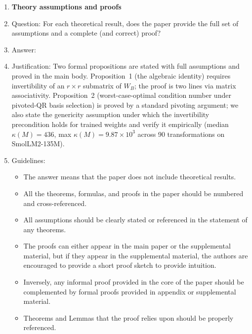 \begin{enumerate}
\begin{itemize}
        \item The authors should discuss the computational efficiency of the proposed algorithms and how they scale with dataset size.
        \item If applicable, the authors should discuss possible limitations of their approach to address problems of privacy and fairness.
        \item While the authors might fear that complete honesty about limitations might be used by reviewers as grounds for rejection, a worse outcome might be that reviewers discover limitations that aren't acknowledged in the paper. The authors should use their best judgment and recognize that individual actions in favor of transparency play an important role in developing norms that preserve the integrity of the community. Reviewers will be specifically instructed to not penalize honesty concerning limitations.
    \end{itemize}

\item {\bf Theory assumptions and proofs}
    \item[] Question: For each theoretical result, does the paper provide the full set of assumptions and a complete (and correct) proof?
    \item[] Answer: \answerYes{} %
    \item[] Justification: Two formal propositions are stated with full assumptions and proved in the main body. Proposition~1 (the algebraic identity) requires invertibility of an $r \times r$ submatrix of $W_B$; the proof is two lines via matrix associativity. Proposition~2 (worst-case-optimal condition number under pivoted-QR basis selection) is proved by a standard pivoting argument; we also state the genericity assumption under which the invertibility precondition holds for trained weights and verify it empirically (median $\kappa(M) = 436$, max $\kappa(M) = 9.87 \times 10^3$ across 90 transformations on SmolLM2-135M).
    \item[] Guidelines:
    \begin{itemize}
        \item The answer \answerNA{} means that the paper does not include theoretical results.
        \item All the theorems, formulas, and proofs in the paper should be numbered and cross-referenced.
        \item All assumptions should be clearly stated or referenced in the statement of any theorems.
        \item The proofs can either appear in the main paper or the supplemental material, but if they appear in the supplemental material, the authors are encouraged to provide a short proof sketch to provide intuition.
        \item Inversely, any informal proof provided in the core of the paper should be complemented by formal proofs provided in appendix or supplemental material.
        \item Theorems and Lemmas that the proof relies upon should be properly referenced.
    \end{itemize}


\end{enumerate}
